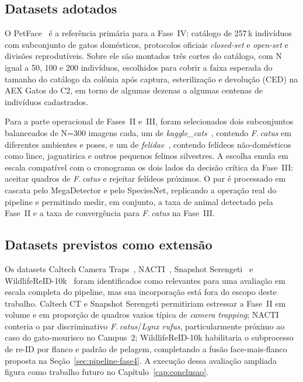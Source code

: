 \subsection*{Datasets adotados}

O PetFace~\cite{shinoda2024petface} é a referência primária para a Fase~IV: catálogo de 257\,k indivíduos com subconjunto de gatos domésticos, protocolos oficiais \textit{closed-set} e \textit{open-set} e divisões reprodutíveis. Sobre ele são montados três cortes do catálogo, com N igual a 50, 100 e 200 indivíduos, escolhidos para cobrir a faixa esperada do tamanho do catálogo da colônia após captura, esterilização e devolução (CED) na AEX Gatos do C2, em torno de algumas dezenas a algumas centenas de indivíduos cadastrados.

Para a parte operacional de Fases~II e~III, foram selecionados dois subconjuntos balanceados de N=300 imagens cada, um de \textit{kaggle\_cats}~\cite{kaggle_cats_dataset}, contendo \textit{F.\,catus} em diferentes ambientes e poses, e um de \textit{felidae}~\cite{felidae_dataset}, contendo felídeos não-domésticos como lince, jaguatirica e outros pequenos felinos silvestres. A escolha emula em escala compatível com o cronograma os dois lados da decisão crítica da Fase~III: aceitar quadros de \textit{F.\,catus} e rejeitar felídeos próximos. O par é processado em cascata pelo MegaDetector e pelo SpeciesNet, replicando a operação real do pipeline e permitindo medir, em conjunto, a taxa de animal detectado pela Fase~II e a taxa de convergência para \textit{F.\,catus} na Fase~III.

\subsection*{Datasets previstos como extensão}

Os datasets Caltech Camera Traps~\cite{beery2018terra}, NACTI~\cite{tabak2019nacti}, Snapshot Serengeti~\cite{norouzzadeh2018automatically} e WildlifeReID-10k~\cite{adam2024wildlifereid10k} foram identificados como relevantes para uma avaliação em escala completa do pipeline, mas sua incorporação está fora do escopo deste trabalho. Caltech CT e Snapshot Serengeti permitiriam estressar a Fase~II em volume e em proporção de quadros vazios típica de \textit{camera trapping}; NACTI conteria o par discriminativo \textit{F.\,catus}/\textit{Lynx rufus}, particularmente próximo ao caso do gato-mourisco no Campus~2; WildlifeReID-10k habilitaria o subprocesso de re-ID por flanco e padrão de pelagem, completando a fusão face-mais-flanco proposta na Seção~\ref{sec:pipeline-fase4}. A execução dessa avaliação ampliada figura como trabalho futuro no Capítulo~\ref{cap:conclusao}.

